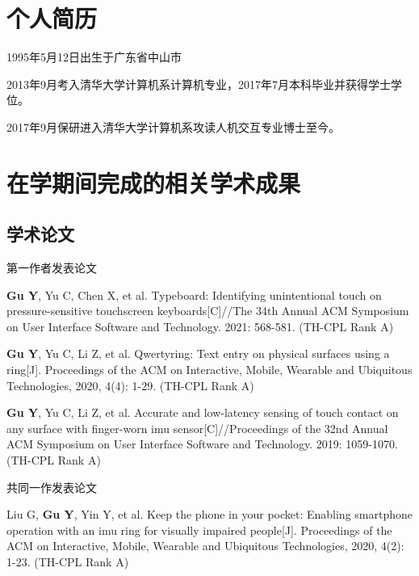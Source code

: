 
\begin{resume}

  \section*{个人简历}

1995年5月12日出生于广东省中山市

2013年9月考入清华大学计算机系计算机专业，2017年7月本科毕业并获得学士学位。

2017年9月保研进入清华大学计算机系攻读人机交互专业博士至今。

 \section*{在学期间完成的相关学术成果}

 \subsection*{学术论文}

第一作者发表论文

\begin{achievements}
 	\item \textbf{Gu Y}, Yu C, Chen X, et al. Typeboard: Identifying unintentional touch on pressure-sensitive touchscreen keyboards[C]//The 34th Annual ACM Symposium on User Interface Software and Technology. 2021: 568-581. (TH-CPL Rank A)
 	\item \textbf{Gu Y}, Yu C, Li Z, et al. Qwertyring: Text entry on physical surfaces using a ring[J]. Proceedings of the ACM on Interactive, Mobile, Wearable and Ubiquitous Technologies, 2020, 4(4): 1-29. (TH-CPL Rank A)
 	\item \textbf{Gu Y}, Yu C, Li Z, et al. Accurate and low-latency sensing of touch contact on any surface with finger-worn imu sensor[C]//Proceedings of the 32nd Annual ACM Symposium on User Interface Software and Technology. 2019: 1059-1070. (TH-CPL Rank A)

\end{achievements}

共同一作发表论文

\begin{achievements}
	\item Liu G, \textbf{Gu Y}, Yin Y, et al. Keep the phone in your pocket: Enabling smartphone operation with an imu ring for visually impaired people[J]. Proceedings of the ACM on Interactive, Mobile, Wearable and Ubiquitous Technologies, 2020, 4(2): 1-23. (TH-CPL Rank A)
\end{achievements}


\end{resume}
